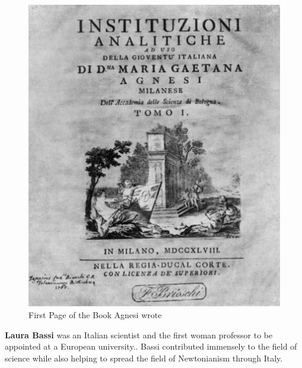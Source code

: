\documentclass[a4paper,10pt]{article}
\begin{document}
\begin{center}
\begin{figure}[h]
\centering
 \includegraphics[scale=1.0]{agnesi.png}
 \caption{First Page of the Book Agnesi wrote}
\end{figure}
\end{center}

\newblock
\textbf{Laura Bassi} was an Italian scientist and the first woman professor to be appointed at a European university.. Bassi contributed immensely to the field of science while also helping to spread the field of Newtonianism through Italy\cite{laura}.
\end{document}
